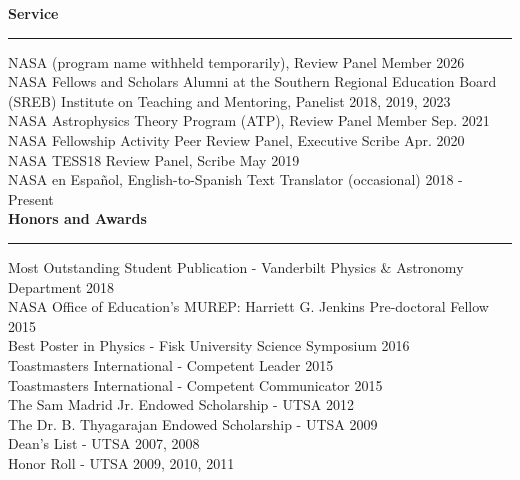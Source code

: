 \documentclass[12pt]{article}
\begin{document}
\noindent
{\bf Service} \\
\vspace{-10mm}
\begin{center}
\rule{\textwidth}{0.2mm}
\end{center}
\vspace{-3mm}
\noindent
NASA (program name withheld temporarily), Review Panel Member \hfill 2026 \\
NASA Fellows and Scholars Alumni at the Southern Regional Education Board (SREB) Institute on Teaching and Mentoring, Panelist \hfill 2018, 2019, 2023 \\
NASA Astrophysics Theory Program (ATP), Review Panel Member \hfill Sep. 2021 \\
NASA Fellowship Activity Peer Review Panel, Executive Scribe \hfill Apr. 2020 \\
NASA TESS18 Review Panel, Scribe \hfill May 2019 \\
NASA en Español, English-to-Spanish Text Translator (occasional) \hfill 2018 - Present \\




\noindent
{\bf Honors and Awards} \\
\vspace{-10mm}
\begin{center}
\rule{\textwidth}{0.2mm}
\end{center}
\vspace{-3mm}
\noindent
Most Outstanding Student Publication - Vanderbilt Physics \& Astronomy Department \hfill 2018 \\
NASA Office of Education's MUREP: Harriett G. Jenkins Pre-doctoral Fellow \hfill 2015 \\
Best Poster in Physics - Fisk University Science Symposium \hfill 2016 \\
Toastmasters International - Competent Leader \hfill 2015 \\
Toastmasters International - Competent Communicator \hfill 2015 \\
The Sam Madrid Jr. Endowed Scholarship - UTSA \hfill 2012 \\
The Dr. B. Thyagarajan Endowed Scholarship - UTSA \hfill 2009 \\
Dean’s List - UTSA \hfill 2007, 2008 \\
Honor Roll - UTSA \hfill 2009, 2010, 2011 \\
\end{document}
